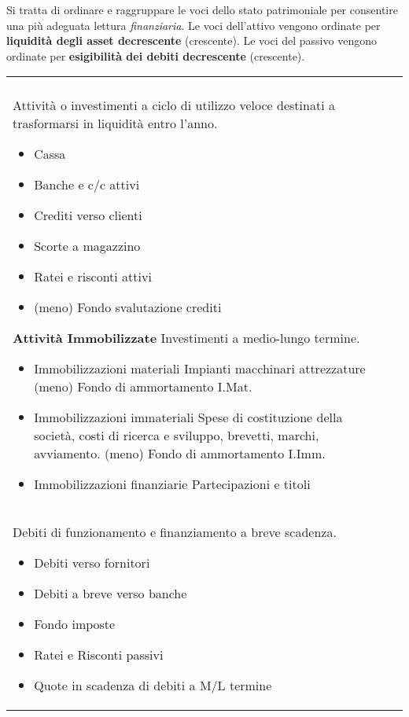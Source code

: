 \documentclass[a4paper,portrait,12pt]{article}
\theoremstyle{definition}
\begin{document}
Si tratta di ordinare e raggruppare le voci dello stato 
patrimoniale per consentire una più adeguata lettura 
\emph{finanziaria}.
Le voci dell’attivo vengono ordinate per \textbf{liquidità degli 
asset decrescente} (crescente).
Le voci del passivo vengono ordinate per \textbf{esigibilità 
dei debiti decrescente} (crescente).

\begin{table}[H]
\begin{center}
\begin{tabular}{ll}
\begin{minipage}[t]{.5\linewidth}
\textbf{Attività Circolanti}\\
Attività o investimenti a ciclo di utilizzo veloce
destinati a trasformarsi in liquidità entro l’anno.
\begin{itemize}
\item Cassa 
\item Banche e c/c attivi
\item Crediti verso clienti
\item Scorte a magazzino
\item Ratei e risconti attivi
\item (meno) Fondo svalutazione crediti
\end{itemize}

\textbf{Attività Immobilizzate}
Investimenti a medio-lungo termine.
\begin{itemize}
\item Immobilizzazioni materiali
Impianti macchinari attrezzature
(meno) Fondo di ammortamento I.Mat.
\item Immobilizzazioni immateriali
Spese di costituzione della società, costi di ricerca
e sviluppo, brevetti, marchi, avviamento.
(meno) Fondo di ammortamento I.Imm.
\item Immobilizzazioni finanziarie
Partecipazioni e titoli
\end{itemize}
\end{minipage}

&

\begin{minipage}[t]{.5\linewidth}
\textbf{Passività Circolanti}\\
Debiti di funzionamento e finanziamento a breve scadenza.
\begin{itemize}
\item Debiti verso fornitori
\item Debiti a breve verso banche
\item Fondo imposte
\item Ratei e Risconti passivi
\item Quote in scadenza di debiti a M/L termine
\end{itemize}


\end{minipage}
\end{tabular}
\end{center}
\end{table}
\end{document}
